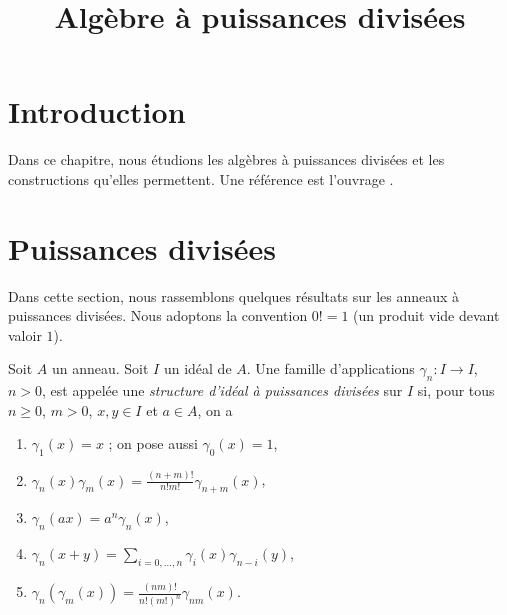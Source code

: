

%


\title{Algèbre à puissances divisées}


\maketitle

\label{section-phantom}

\tableofcontents

\section{Introduction}
\label{section-introduction}

\noindent
Dans ce chapitre, nous étudions les algèbres à puissances divisées et les
constructions qu'elles permettent. Une référence est l'ouvrage \cite{Berthelot}.





\section{Puissances divisées}
\label{section-divided-powers}

\noindent
Dans cette section, nous rassemblons quelques résultats sur les anneaux à puissances divisées.
Nous adoptons la convention $0! = 1$ (un produit vide devant valoir $1$).

\begin{definition}
\label{definition-divided-powers}
Soit $A$ un anneau. Soit $I$ un idéal de $A$. Une famille d'applications
$\gamma_n : I \to I$, $n > 0$, est appelée une {\it structure d'idéal à puissances divisées}
sur $I$ si, pour tous $n \geq 0$, $m > 0$, $x, y \in I$ et $a \in A$, on a
\begin{enumerate}
\item $\gamma_1(x) = x$ ; on pose aussi $\gamma_0(x) = 1$,
\item $\gamma_n(x)\gamma_m(x) = \frac{(n + m)!}{n! m!} \gamma_{n + m}(x)$,
\item $\gamma_n(ax) = a^n \gamma_n(x)$,
\item $\gamma_n(x + y) = \sum_{i = 0, \ldots, n} \gamma_i(x)\gamma_{n - i}(y)$,
\item $\gamma_n(\gamma_m(x)) = \frac{(nm)!}{n! (m!)^n} \gamma_{nm}(x)$.
\end{enumerate}
\end{definition}

